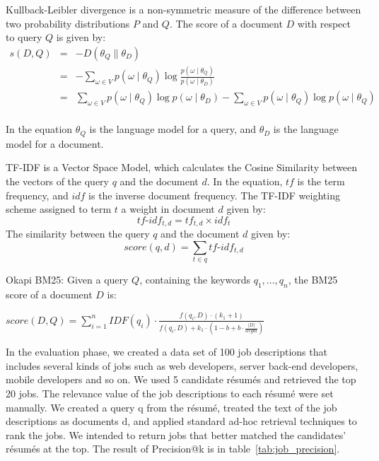 Kullback-Leibler divergence is a non-symmetric measure of the difference between two probability distributions $P$ and $Q$. The score of a document $D$ with respect to query $Q$ is given by:
\begin{equation}
    \begin{array}{rcl}
        s(D,Q) & = & -D( \theta_Q \parallel  \theta_D )\\
               & = &- \sum_{ \omega \in V } p (\omega \mid \theta_Q) \log \frac{ p (\omega \mid \theta_Q )}{p(\omega \mid \theta_D)} \\
               & = & \sum_{ \omega \in V } p (\omega \mid \theta_Q) \log p (\omega \mid \theta_D ) -  \sum_{ \omega \in V } p (\omega \mid \theta_Q) \log p (\omega \mid \theta_Q )  \\

    \end{array}
\end{equation}

In the equation $\theta_Q$ is the language model for a query, and  $\theta_D$ is the language model for a document.

TF-IDF is a Vector Space Model, which calculates the Cosine Similarity between the vectors of the query $q$ and the document $d$. In the equation, $tf$ is the term frequency, and $idf$ is the inverse document frequency. The TF-IDF weighting scheme assigned to term $t$ a weight in document $d$ given by:
$$ tf\text{-}idf_{t,d} = tf_{t,d} \times idf_{t} $$
The similarity between the query $q$ and the document $d$ given by:
$$ score(q,d) =  \sum_{t \in q }  tf\text{-}idf_{t,d} $$

Okapi BM25: Given a query $Q$, containing the keywords $q_1, ..., q_n$, the BM25 score of a document $D$ is:

$ score(D,Q) = \sum_{ i=1 }^{n} IDF(q_i) \cdot   \frac {f(q_i,D) \cdot (k_1 + 1)}{f(q_i,D) + k_1 \cdot ( 1-b + b\cdot \frac { \left | D \right |}{avgdl})}  $

In the evaluation phase, we created a data set of 100 job descriptions that includes several kinds of jobs such as web developers, server back-end developers, mobile developers and so on. We used 5 candidate r\'esum\'es and retrieved the top 20 jobs.  The relevance value of the job descriptions to each r\'esum\'e were set manually. We created a query q from the r\'esum\'e, treated the text of the job descriptions as documents d, and applied standard ad-hoc retrieval techniques to rank the jobs. We intended to return jobs that better matched the candidates' r\'esum\'es at the top. The result of Precision@k is in table~\ref{tab:job_precision}.


